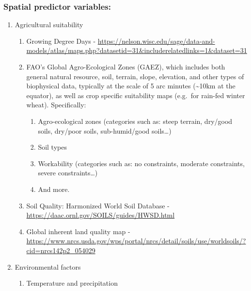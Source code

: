 \documentclass[
]{article}
\providecommand{\tightlist}{%
  \setlength{\itemsep}{0pt}\setlength{\parskip}{0pt}}
\begin{document}
\hypertarget{spatial-predictor-variables}{%
\subsubsection{Spatial predictor variables:}\label{spatial-predictor-variables}}

\begin{enumerate}
\def\labelenumi{\arabic{enumi}.}
\tightlist
\item
  Agricultural suitability

  \begin{enumerate}
  \def\labelenumii{\alph{enumii}.}
  \tightlist
  \item
    Growing Degree Days - \url{https://nelson.wisc.edu/sage/data-and-models/atlas/maps.php?datasetid=31\&includerelatedlinks=1\&dataset=31}
  \item
    FAO's Global Agro-Ecological Zones (GAEZ), which includes both general natural resource, soil, terrain, slope, elevation, and other types of biophysical data, typically at the scale of 5 arc minutes (\textasciitilde10km at the equator), as well as crop specific suitability maps (e.g.~for rain-fed winter wheat). Specifically:

    \begin{enumerate}
    \def\labelenumiii{\roman{enumiii}.}
    \tightlist
    \item
      Agro-ecological zones (categories such as: steep terrain, dry/good soils, dry/poor soils, sub-humid/good soils\ldots)
    \item
      Soil types
    \item
      Workability (categories such as: no constraints, moderate constraints, severe constraints\ldots)
    \item
      And more.
    \end{enumerate}
  \item
    Soil Quality: Harmonized World Soil Database - \url{https://daac.ornl.gov/SOILS/guides/HWSD.html}
  \item
    Global inherent land quality map - \url{https://www.nrcs.usda.gov/wps/portal/nrcs/detail/soils/use/worldsoils/?cid=nrcs142p2_054029}
  \end{enumerate}
\item
  Environmental factors

  \begin{enumerate}
  \def\labelenumii{\alph{enumii}.}
  \tightlist
  \item
    Temperature and precipitation


\end{enumerate}
\end{enumerate}
\end{document}
